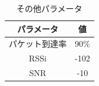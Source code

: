 \begin{table}[]
    \caption{その他パラメータ}\label{fig:LoRaWAN_Parameter}
    \centering
    \begin{tabular}{|c|c|}
    \hline
    \textbf{パラメータ} & \textbf{値} \\ \hline
    パケット到達率        & 90\%       \\ \hline
    RSSi           & -102       \\ \hline
    SNR            & -10        \\ \hline
    \end{tabular}
\end{table}